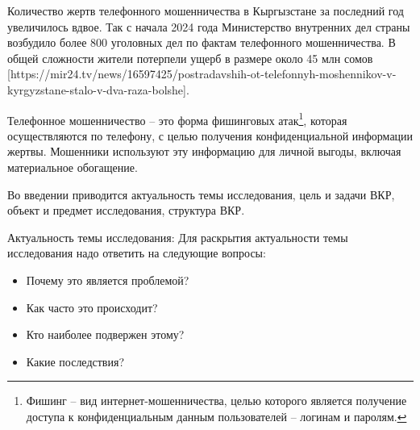Количество жертв телефонного мошенничества в Кыргызстане за последний год увеличилось вдвое. Так с начала 2024 года Министерство внутренних дел страны возбудило более 800 уголовных дел по фактам телефонного мошенничества. В общей сложности жители потерпели ущерб в размере около 45 млн сомов [https://mir24.tv/news/16597425/postradavshih-ot-telefonnyh-moshennikov-v-kyrgyzstane-stalo-v-dva-raza-bolshe].

Телефонное мошенничество – это форма фишинговых атак\footnote{Фишинг –  вид интернет-мошенничества, целью которого является получение доступа к конфиденциальным данным пользователей – логинам и паролям.}, которая осуществляются по телефону, с целью получения конфиденциальной информации жертвы. Мошенники используют эту информацию для личной выгоды, включая материальное обогащение.



Во введении приводится актуальность темы исследования, цель и задачи ВКР, объект и предмет исследования, структура ВКР.

Актуальность темы исследования:
Для раскрытия актуальности темы исследования надо ответить на следующие вопросы:
\begin{itemize}
	\item Почему это является проблемой?
	\item Как часто это происходит?
	\item Кто наиболее подвержен этому?
	\item Какие последствия?
\end{itemize}

\newpage